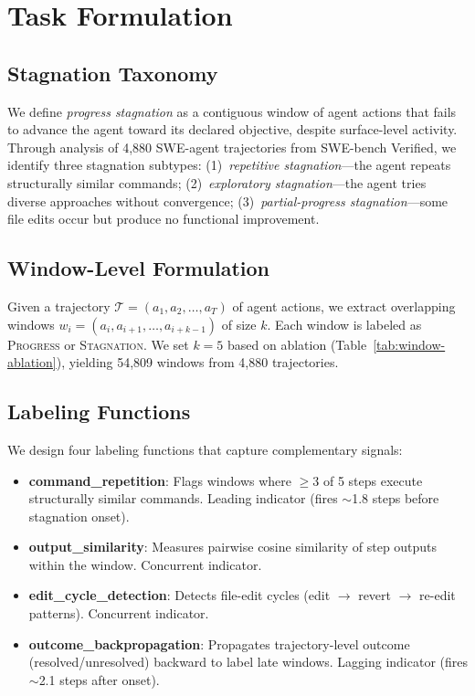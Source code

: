 \documentclass[11pt,a4paper]{article}
\begin{document}
\section{Task Formulation}
\label{sec:task}

\subsection{Stagnation Taxonomy}

We define \emph{progress stagnation} as a contiguous window of agent actions that fails to advance the agent toward its declared objective, despite surface-level activity.
Through analysis of 4,880 SWE-agent trajectories from SWE-bench Verified, we identify three stagnation subtypes: (1)~\emph{repetitive stagnation}---the agent repeats structurally similar commands; (2)~\emph{exploratory stagnation}---the agent tries diverse approaches without convergence; (3)~\emph{partial-progress stagnation}---some file edits occur but produce no functional improvement.

\subsection{Window-Level Formulation}

Given a trajectory $\mathcal{T} = (a_1, a_2, \ldots, a_T)$ of agent actions, we extract overlapping windows $w_i = (a_i, a_{i+1}, \ldots, a_{i+k-1})$ of size $k$.
Each window is labeled as \textsc{Progress} or \textsc{Stagnation}.
We set $k{=}5$ based on ablation (Table~\ref{tab:window-ablation}), yielding 54,809 windows from 4,880 trajectories.

\subsection{Labeling Functions}
\label{sec:lfs}

We design four labeling functions that capture complementary signals:

\begin{itemize}
\item \textbf{command\_repetition}: Flags windows where $\geq$3 of 5 steps execute structurally similar commands. Leading indicator (fires ${\sim}$1.8 steps before stagnation onset).
\item \textbf{output\_similarity}: Measures pairwise cosine similarity of step outputs within the window. Concurrent indicator.
\item \textbf{edit\_cycle\_detection}: Detects file-edit cycles (edit $\to$ revert $\to$ re-edit patterns). Concurrent indicator.
\item \textbf{outcome\_backpropagation}: Propagates trajectory-level outcome (resolved/unresolved) backward to label late windows. Lagging indicator (fires ${\sim}$2.1 steps after onset).
\end{itemize}
\end{document}
